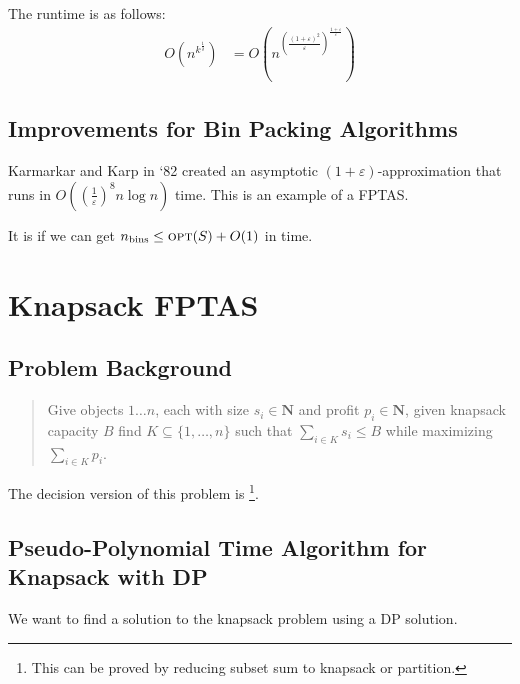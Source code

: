                     The runtime is as follows:
                    \begin{align*}
                        O(n^{k^\frac{1}{\delta}}) &= O\left(n^                        {\left( \frac{(1 + \varepsilon)^2}{\varepsilon} \right) ^\frac{1+\varepsilon}{\varepsilon}}
\right)
                    \end{align*}
            \section{Improvements for Bin Packing Algorithms} %
            \label{sec:improvements_for_bin_packing_algorithms}
                Karmarkar and Karp in `82 created an asymptotic $(1 + \varepsilon)$-approximation that runs in $O\left( \left(\frac{1}{\varepsilon} \right)^8 n \log n \right)$ time.
                This is an example of a FPTAS.

                It is \open if we can get $n_\text{bins} \le \textsc{opt}(S) + O(1)$ in \p time.
        \chapter{Knapsack FPTAS} %
        \label{cha:knapsack_fptas}
            \section{Problem Background} %
            \label{sec:problem_background}
                \begin{quotation}
                    Give objects $1 \ldots n$, each with size $s_i \in \mathbf{N}$ and profit $p_i \in \mathbf{N}$, given knapsack capacity $B$ find $K \subseteq \{1, \ldots, n \}$ such that $\sum_{i \in K} s_i \le B$ while maximizing $\sum_{i \in K} p_i$.
                \end{quotation}

                The decision version of this problem is \npcomplete\footnote{This can be proved by reducing subset sum to knapsack or partition.}.
            \section{Pseudo-Polynomial Time Algorithm for Knapsack with DP} %
            \label{sec:pseudo_polynomial_time_algorithm_for_knapsack_with_dp}
                We want to find a solution to the knapsack problem using a DP solution.

